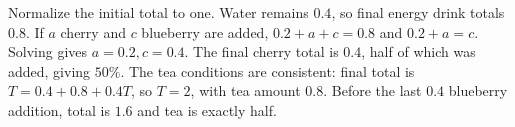 Normalize the initial total to one. Water remains $0.4$, so final energy drink totals $0.8$. If $a$ cherry and $c$ blueberry are added, $0.2+a+c=0.8$ and $0.2+a=c$. Solving gives $a=0.2,c=0.4$. The final cherry total is $0.4$, half of which was added, giving $\boxed{50\%}$.
The tea conditions are consistent: final total is $T=0.4+0.8+0.4T$, so $T=2$, with tea amount $0.8$. Before the last $0.4$ blueberry addition, total is $1.6$ and tea is exactly half.
